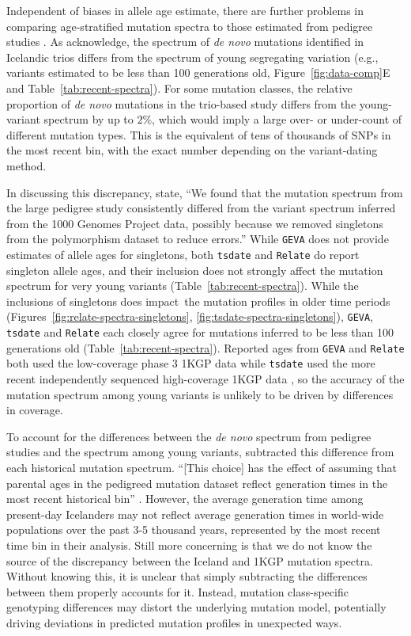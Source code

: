 \documentclass[]{article}
\newcommand{\GEVA}{\texttt{GEVA}\xspace}
\newcommand{\tsdate}{\texttt{tsdate}\xspace}
\newcommand{\relate}{\texttt{Relate}\xspace}
\begin{document}
Independent of biases in allele age estimate, there are further problems in
comparing age-stratified mutation spectra to those estimated from pedigree
studies \citep{jonsson2017parental,halldorsson2019characterizing}. As
\citet{wang2023human} acknowledge, the spectrum of \emph{de novo} mutations
identified in Icelandic trios \citep{jonsson2017parental} differs from the
spectrum of young segregating variation (e.g., variants estimated to be less
    than 100 generations old, Figure~\ref{fig:data-comp}E and
Table~\ref{tab:recent-spectra}). 
For some mutation classes, the relative proportion of \emph{de novo} mutations
in the trio-based study differs from the young-variant spectrum by up to
$2\%$, which would imply a large over- or under-count of different mutation
types. This is the equivalent of tens of thousands of SNPs in the most recent
bin, with the exact number depending on the variant-dating method.

In discussing this discrepancy, \citet{wang2023human} state, ``We found that
the mutation spectrum from the large pedigree study consistently differed from
the variant spectrum inferred from the 1000 Genomes Project data, possibly
because we removed singletons from the polymorphism dataset to reduce errors.''
While \GEVA does not provide estimates of allele ages for singletons, both
\tsdate and \relate do report singleton allele ages, and their inclusion does
not strongly affect the mutation spectrum for very young variants
(Table~\ref{tab:recent-spectra}). While the inclusions of singletons does
impact\ the mutation profiles in older time periods
(Figures~\ref{fig:relate-spectra-singletons},
\ref{fig:tsdate-spectra-singletons}), \GEVA, \tsdate and \relate each closely
agree for mutations inferred to be less than 100 generations old
(Table~\ref{tab:recent-spectra}). Reported ages from \GEVA and \relate both
used the low-coverage phase 3 1KGP data while \tsdate used the more recent
independently sequenced high-coverage 1KGP data \citep{byrska2022high}, so the
accuracy of the mutation spectrum among young variants is unlikely to be driven
by differences in coverage.

To account for the differences between the \emph{de novo} spectrum from
pedigree studies \citep{jonsson2017parental} and the spectrum among young
variants, \citet{wang2023human} subtracted this difference from each historical
mutation spectrum. ``[This choice] has the effect of assuming that parental ages
in the pedigreed mutation dataset reflect generation times in the most recent
historical bin'' \citep{wang2023human}. However, the average generation time
among present-day Icelanders may not reflect average generation times in
world-wide populations over the past 3-5 thousand years, represented by the
most recent time bin in their analysis. Still more concerning is that we do not
know the source of the discrepancy between the Iceland and 1KGP mutation
spectra. Without knowing this, it is unclear that simply subtracting the
differences between them properly accounts for it. Instead, mutation
class-specific genotyping differences may distort the underlying mutation
model, potentially driving deviations in predicted mutation profiles in
unexpected ways.
\end{document}
